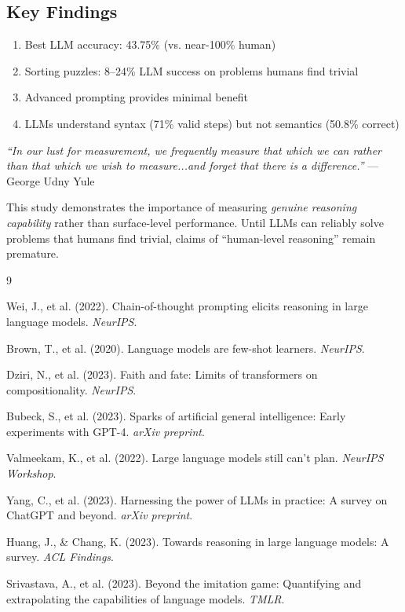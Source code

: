 \documentclass[11pt,a4paper]{article}
\begin{document}
\subsection{Key Findings}

\begin{enumerate}
    \item Best LLM accuracy: 43.75\% (vs. near-100\% human)
    \item Sorting puzzles: 8--24\% LLM success on problems humans find trivial
    \item Advanced prompting provides minimal benefit
    \item LLMs understand syntax (71\% valid steps) but not semantics (50.8\% correct)
\end{enumerate}

\begin{tcolorbox}[colback=blue!5,colframe=blue!50!black,title=Final Reflection]
\textit{``In our lust for measurement, we frequently measure that which we can rather than that which we wish to measure...and forget that there is a difference.''} --- George Udny Yule

This study demonstrates the importance of measuring \textit{genuine reasoning capability} rather than surface-level performance. Until LLMs can reliably solve problems that humans find trivial, claims of ``human-level reasoning'' remain premature.
\end{tcolorbox}


\begin{thebibliography}{9}

Wei, J., et al. (2022). Chain-of-thought prompting elicits reasoning in large language models. \textit{NeurIPS}.

Brown, T., et al. (2020). Language models are few-shot learners. \textit{NeurIPS}.

Dziri, N., et al. (2023). Faith and fate: Limits of transformers on compositionality. \textit{NeurIPS}.

Bubeck, S., et al. (2023). Sparks of artificial general intelligence: Early experiments with GPT-4. \textit{arXiv preprint}.

Valmeekam, K., et al. (2022). Large language models still can't plan. \textit{NeurIPS Workshop}.

Yang, C., et al. (2023). Harnessing the power of LLMs in practice: A survey on ChatGPT and beyond. \textit{arXiv preprint}.

Huang, J., \& Chang, K. (2023). Towards reasoning in large language models: A survey. \textit{ACL Findings}.

Srivastava, A., et al. (2023). Beyond the imitation game: Quantifying and extrapolating the capabilities of language models. \textit{TMLR}.

\end{thebibliography}
\end{document}
